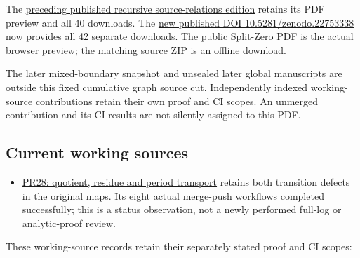 \documentclass[
]{article}
\providecommand{\tightlist}{%
  \setlength{\itemsep}{0pt}\setlength{\parskip}{0pt}}
\begin{document}
The \href{https://doi.org/10.5281/zenodo.22739630}{preceding published
recursive source-relations edition} retains its PDF preview and all 40
downloads. The \href{https://doi.org/10.5281/zenodo.22753338}{new
published DOI 10.5281/zenodo.22753338} now provides
\href{calculation_edition_20260914_cumulative_graph/README.md}{all 42
separate downloads}. The public Split-Zero PDF is the actual browser
preview; the
\href{https://zenodo.org/api/records/22753338/files/42-splitzero-cumulative-graph-public-sources.zip/content}{matching
source ZIP} is an offline download.

The later mixed-boundary snapshot and unsealed later global manuscripts
are outside this fixed cumulative graph source cut. Independently
indexed working-source contributions retain their own proof and CI
scopes. An unmerged contribution and its CI results are not silently
assigned to this PDF.

\subsection{Current working sources}\label{current-working-sources}

\begin{itemize}
\tightlist
\item
  \href{workbenches/tau-split-integration/RESEARCH_NOTE.md}{PR28:
  quotient, residue and period transport} retains both transition
  defects in the original maps. Its eight actual merge-push workflows
  completed successfully; this is a status observation, not a newly
  performed full-log or analytic-proof review.
\end{itemize}

These working-source records retain their separately stated proof and CI
scopes:
\end{document}
